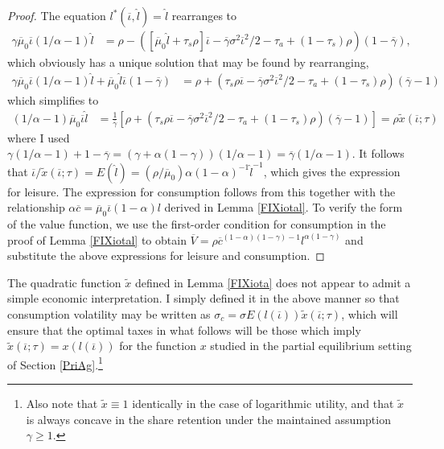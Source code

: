 \documentclass[11pt]{article}
\theoremstyle{plain}
\begin{document}
\begin{proof}
The equation $l^*(\overline{\iota}, \hat{l}) = \hat{l}$ rearranges to 
\begin{align*}
\gamma\overline{\mu}_0\overline{\iota}(1/\alpha-1)\hat{l} & = \rho - {\left([\overline{\mu}_0\hat{l} + \tau_s\rho]\overline{\iota} - \overline{\gamma}\sigma^2\overline{\iota}^2/2 - \tau_a + (1-\tau_s)\rho\right)}(1 - \overline{\gamma}),
\end{align*}
which obviously has a unique solution that may be found by rearranging,
\begin{align*}
\gamma\overline{\mu}_0\overline{\iota}(1/\alpha-1)\hat{l} + \overline{\mu}_0\hat{l}\overline{\iota}(1 - \overline{\gamma}) & = \rho + {\left( \tau_s\rho\overline{\iota} - \overline{\gamma}\sigma^2\overline{\iota}^2/2 - \tau_a + (1-\tau_s)\rho\right)}( \overline{\gamma}-1)
\end{align*}
which simplifies to
\begin{align*}
(1/\alpha-1)\overline{\mu}_0\overline{\iota}\hat{l} & = \frac{1}{\overline{\gamma}}{\left[\rho + {\left( \tau_s\rho\overline{\iota} - \overline{\gamma}\sigma^2\overline{\iota}^2/2 - \tau_a + (1-\tau_s)\rho\right)}( \overline{\gamma}-1)\right]} = \rho \tilde{x}(\overline{\iota};\tau)
\end{align*}
where I used $\gamma(1/\alpha-1) + 1 - \overline{\gamma} = {\left(\gamma + \alpha(1 - \gamma)\right)}(1/\alpha - 1) = \overline{\gamma}(1/\alpha - 1)$. It follows that $\overline{\iota}/\tilde{x}(\overline{\iota};\tau) = E(\hat{l}) = (\rho/\overline{\mu}_0) \alpha(1-\alpha)^{-1}\hat{l}^{-1}$, which gives the expression for leisure. The expression for consumption follows from this together with the relationship $\alpha \overline{c} = \overline{\mu}_0\overline{\iota}(1 - \alpha)l$ derived in Lemma \ref{FIXiotal}. To verify the form of the value function, we use the first-order condition for consumption in the proof of Lemma \ref{FIXiotal} to obtain $\overline{V} = \rho\overline{c}^{(1-\alpha)(1-\gamma)-1}l^{\alpha(1-\gamma)}$ and substitute the above expressions for leisure and consumption. 
\end{proof}


The quadratic function $\tilde{x}$ defined in Lemma \ref{FIXiota} does not appear to admit a simple economic interpretation. I simply defined it in the above manner so that consumption volatility may be written as $\sigma_c = \sigma E(l(\overline{\iota}))\tilde{x}(\overline{\iota};\tau)$, which will ensure that the optimal taxes in what follows will be those which imply $\tilde{x}(\overline{\iota};\tau) = x(l(\overline{\iota}))$ for the function $x$ studied in the partial equilibrium setting of Section \ref{PriAg}.\footnote{Also note that $\tilde{x} \equiv 1$ identically in the case of logarithmic utility, and that $\tilde{x}$ is always concave in the share retention under the maintained assumption $\gamma \geq 1$.}
\end{document}
